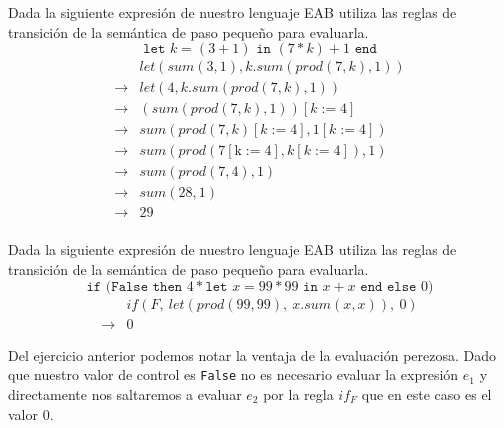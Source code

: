     \begin{exercise}
        Dada la siguiente expresión de nuestro lenguaje \textsf{EAB} utiliza las reglas de transición de la semántica de paso pequeño para evaluarla.
        \[
            \texttt{let } k = (3 + 1) \texttt{ in } (7 * k) + 1 \texttt{ end} 
        \]
        \[
            \begin{array}{cl}
                &\textit{let}(\textit{sum}(3,1), \textit{k}.\textit{sum}(\textit{prod}(7,\textit{k}), 1))\\
                \rightarrow &\textit{let}(4, \textit{k}.\textit{sum}(\textit{prod}(7, \textit{k}), 1))\\
                \rightarrow &(\textit{sum}(\textit{prod}(7, \textit{k}),1))[\textit{k}:=4]\\
                \rightarrow &\textit{sum}(\textit{prod}(7, \textit{k})[\textit{k}:=4],1[\textit{k}:=4])\\
                \rightarrow &\textit{sum}(\textit{prod}(7[\text{k}:=4], \textit{k}[\textit{k}:=4]),1)\\
                \rightarrow &\textit{sum}(\textit{prod}(7, 4), 1)\\
                \rightarrow &\textit{sum}(28, 1)\\
                \rightarrow &29\\
                

            \end{array}
        \]
        
    \end{exercise}


    \begin{exercise}
        Dada la siguiente expresión de nuestro lenguaje \textsf{EAB} utiliza las reglas de transición de la semántica de paso pequeño para evaluarla.
        \[
            \texttt{if (}\texttt{False} \texttt{ then } 4 * \texttt{let } x = 99 * 99 \texttt{ in } x + x \texttt{ end} \texttt{ else } 0 \texttt{)}
        \] 
        \[
            \begin{array}{cl}
                &if(F,\ let(prod(99,99),\ x.sum(x,x)),\ 0)\\
                \rightarrow &0

            \end{array}
        \]
    \end{exercise}

    Del ejercicio anterior podemos notar la ventaja de la evaluación perezosa. Dado que nuestro valor de control es \texttt{False} no es necesario evaluar la expresión $e_1$ y directamente nos saltaremos a evaluar $e_2$ por la regla $if_F$ que en este caso es el valor 0.\\
    
